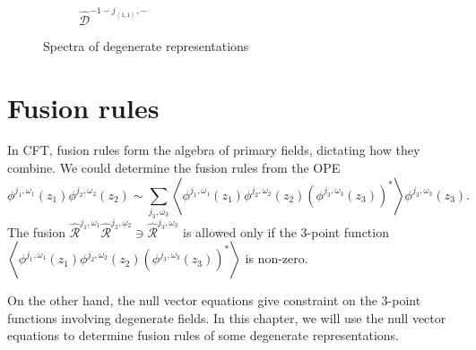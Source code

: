 \documentclass[10pt,a4paper]{article}
\numberwithin{equation}{section}
\newcommand{\vev}[1]{\left\langle #1 \right\rangle}
\begin{document}
\begin{figure}[htbp]
\begin{subfigure}[b]{0.48\textwidth}
        \caption{$\widehat{\mathcal{D}}^{-1-j_{\vev{1,1}}, -}$}
        \label{fig:E 1_-1}
    \end{subfigure}

    \caption{Spectra of degenerate representations}
    \label{fig:degrep}
\end{figure}

\newpage

\section{Fusion rules}
In CFT, fusion rules form the algebra of primary fields, dictating how they combine. We could determine the fusion rules from the 
OPE 
\begin{equation}
    \phi^{j_{1},\omega_{1}}(z_{1}) \phi^{j_{2},\omega_{2}}(z_{2}) \sim \sum_{j_{3},\omega_{3}}
    \vev{\phi^{j_{1},\omega_{1}}(z_{1}) \phi^{j_{2},\omega_{2}}(z_{2}) \left(\phi^{j_{3},\omega_{3}}(z_{3}) \right)^{*}} \phi^{j_{3},\omega_{3}}(z_{3}).
\end{equation}
The fusion $\widehat{\mathcal{R}}^{j_{1},\omega_{1}} \widehat{\mathcal{R}}^{j_{2},\omega_{2}} \ni \widehat{\mathcal{R}}^{j_{3},\omega_{3}}$
is allowed only if the 3-point function 
$\vev{\phi^{j_{1},\omega_{1}}(z_{1}) \phi^{j_{2},\omega_{2}}(z_{2}) \left(\phi^{j_{3},\omega_{3}}(z_{3}) \right)^{*}}$ is non-zero.

On the other hand, the null vector equations give constraint on the 3-point functions involving degenerate fields. In this chapter, we 
will use the null vector equations to determine fusion rules of some degenerate representations.
\end{document}
